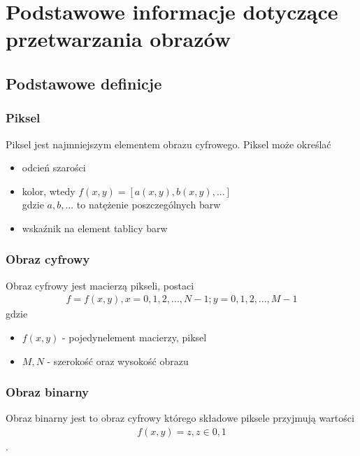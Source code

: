 \section{Podstawowe informacje dotyczące przetwarzania obrazów}
\subsection{Podstawowe definicje}
\subsubsection{Piksel}
Piksel jest najmniejszym elementem obrazu cyfrowego. Piksel może określać
\begin{itemize}
\item odcień szarości
\item kolor, wtedy \(f(x, y) = [a(x, y), b(x, y),...]\)\\
  gdzie $a, b,...$ to natężenie poszczególnych barw
\item wskaźnik na element tablicy barw
\end{itemize}
\subsubsection{Obraz cyfrowy}
Obraz cyfrowy jest macierzą pikseli, postaci
\begin{gather*}
  f = f(x, y), x = 0,1,2,...,N-1; y = 0,1,2,...,M-1
\end{gather*}
gdzie
\begin{itemize}
\item \(f(x, y)\) - pojedynelement macierzy, piksel
\item \(M, N\) - szerokość oraz wysokość obrazu
\end{itemize}
\subsubsection{Obraz binarny}
Obraz binarny jest to obraz cyfrowy którego składowe piksele przyjmują wartości
\begin{gather*}
  f(x, y) = z, z \in {0, 1}
\end{gather*}.
